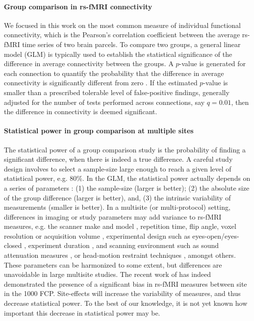 \documentclass[authoryear]{elsarticle}
\begin{document}
\paragraph{Group comparison in rs-fMRI connectivity}
We focused in this work on the most common measure of individual functional connectivity, which is the Pearson's correlation coefficient between the average rs-fMRI time series of two brain parcels. To compare two groups, a general linear model (GLM) is typically used to establish the statistical significance of the difference in average connectivity between the groups. A $p$-value is generated for each connection to quantify the probability that the difference in average connectivity is significantly different from zero \citep{Worsley1995}. If the estimated $p$-value is smaller than a prescribed tolerable level of false-positive findings, generally adjusted for the number of tests performed across connections, say $q=0.01$, then the difference in connectivity is deemed significant. 

\paragraph{Statistical power in group comparison at multiple sites}
The statistical power of a group comparison study is the probability of finding a significant difference, when there is indeed a true difference. A careful study design involves to select a sample-size large enough to reach a given level of statistical power, e.g. 80\%. In the GLM, the statistical power actually depends on a series of parameters \citep{Desmond2002}: (1) the sample-size (larger is better); (2) the absolute size of the group difference (larger is better), and, (3) the intrinsic variability of measurements (smaller is better). 
In a multisite (or multi-protocol) setting, differences in imaging or study parameters may add variance to rs-fMRI measures, e.g. the scanner make and model \citep{Friedman2006}, repetition time, flip angle, voxel resolution or acquisition volume \citep{Friedman2006a}, experimental design such as eyes-open/eyes-closed \citep{Yan2009}, experiment duration \citep{VanDijk2010}, and scanning environment such as sound attenuation measures \citep{Elliott1999}, or head-motion restraint techniques \citep{Edward2000}, amongst others. These parameters can be harmonized to some extent, but differences are unavoidable in large multisite studies. The recent work of \cite{Yan2013h} has indeed demonstrated the presence of a significant bias in rs-fMRI measures between site in the 1000 FCP. Site-effects will increase the variability of measures, and thus decrease statistical power. To the best of our knowledge, it is not yet known how important this decrease in statistical power may be. 
\end{document}
